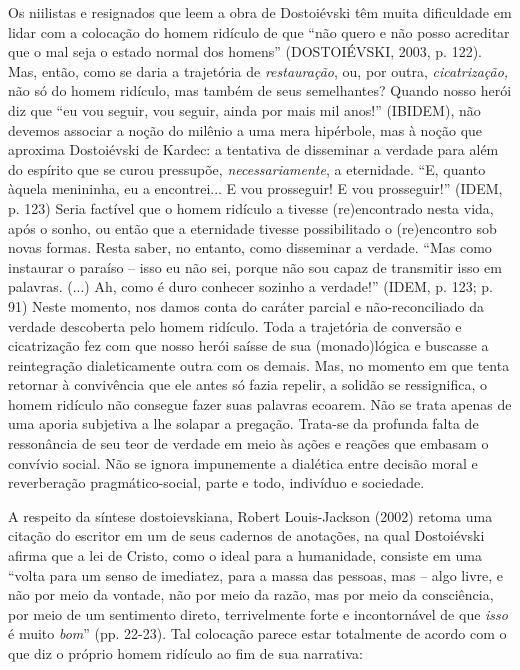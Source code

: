 Os niilistas e resignados que leem a obra de Dostoiévski têm muita
dificuldade em lidar com a colocação do homem ridículo de que ``não
quero e não posso acreditar que o mal seja o estado normal dos homens''
(DOSTOIÉVSKI, 2003, p. 122). Mas, então, como se daria a trajetória de
\emph{restauração}, ou, por outra, \emph{cicatrização,} não só do homem
ridículo, mas também de seus semelhantes? Quando nosso herói diz que
``eu vou seguir, vou seguir, ainda por mais mil anos!'' (IBIDEM), não
devemos associar a noção do milênio a uma mera hipérbole, mas à noção
que aproxima Dostoiévski de Kardec: a tentativa de disseminar a verdade
para além do espírito que se curou pressupõe, \emph{necessariamente}, a
eternidade. ``E, quanto àquela menininha, eu a encontrei... E vou
prosseguir! E vou prosseguir!'' (IDEM, p. 123) Seria factível que o
homem ridículo a tivesse (re)encontrado nesta vida, após o sonho, ou
então que a eternidade tivesse possibilitado o (re)encontro sob novas
formas. Resta saber, no entanto, como disseminar a verdade. ``Mas como
instaurar o paraíso -- isso eu não sei, porque não sou capaz de
transmitir isso em palavras. (...) Ah, como é duro conhecer sozinho a
verdade!'' (IDEM, p. 123; p. 91) Neste momento, nos damos conta do
caráter parcial e não-reconciliado da verdade descoberta pelo homem
ridículo. Toda a trajetória de conversão e cicatrização fez com que
nosso herói saísse de sua (monado)lógica e buscasse a reintegração
dialeticamente outra com os demais. Mas, no momento em que tenta
retornar à convivência que ele antes só fazia repelir, a solidão se
ressignifica, o homem ridículo não consegue fazer suas palavras ecoarem.
Não se trata apenas de uma aporia subjetiva a lhe solapar a pregação.
Trata-se da profunda falta de ressonância de seu teor de verdade em meio
às ações e reações que embasam o convívio social. Não se ignora
impunemente a dialética entre decisão moral e reverberação
pragmático-social, parte e todo, indivíduo e sociedade.

A respeito da síntese dostoievskiana, Robert Louis-Jackson (2002) retoma
uma citação do escritor em um de seus cadernos de anotações, na qual
Dostoiévski afirma que a lei de Cristo, como o ideal para a humanidade,
consiste em uma ``volta para um senso de imediatez, para a massa das
pessoas, mas -- algo livre, e não por meio da vontade, não por meio da
razão, mas por meio da consciência, por meio de um sentimento direto,
terrivelmente forte e incontornável de que \emph{isso} é muito
\emph{bom}'' (pp. 22-23). Tal colocação parece estar totalmente de
acordo com o que diz o próprio homem ridículo ao fim de sua narrativa:

